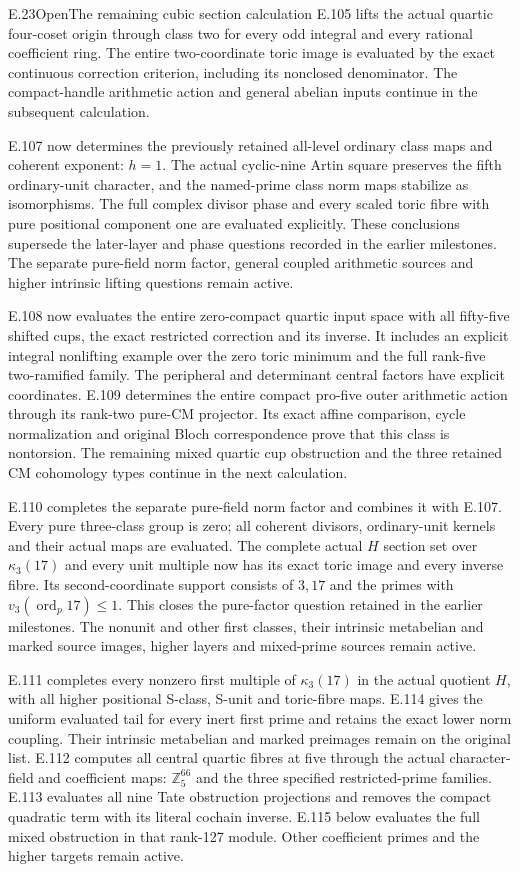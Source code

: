 \begin{statement}{E.23}{Open}{The remaining cubic section calculation}
E.105 lifts the actual quartic four-coset origin through class two
for every odd integral and every rational coefficient ring.
The entire two-coordinate toric image is evaluated by the exact
continuous correction criterion, including its nonclosed denominator.
The compact-handle arithmetic action and general abelian inputs
continue in the subsequent calculation.

E.107 now determines the previously retained all-level ordinary
class maps and coherent exponent: $h=1$.
The actual cyclic-nine Artin square preserves the fifth ordinary-unit
character, and the named-prime class norm maps stabilize as
isomorphisms. The full complex divisor phase and every scaled toric
fibre with pure positional component one are evaluated explicitly.
These conclusions supersede the later-layer and phase questions
recorded in the earlier milestones. The separate pure-field norm
factor, general coupled arithmetic sources and higher intrinsic
lifting questions remain active.


E.108 now evaluates the entire zero-compact quartic input space
with all fifty-five shifted cups, the exact restricted correction
and its inverse. It includes an explicit integral nonlifting example
over the zero toric minimum and the full rank-five two-ramified family.
The peripheral and determinant central factors have explicit coordinates.
E.109 determines the entire compact pro-five outer arithmetic action
through its rank-two pure-CM projector. Its exact affine comparison,
cycle normalization and original Bloch correspondence prove that this
class is nontorsion. The remaining mixed quartic cup obstruction and
the three retained CM cohomology types continue in the next calculation.

E.110 completes the separate pure-field norm factor and combines it
with E.107. Every pure three-class group is zero; all coherent divisors,
ordinary-unit kernels and their actual maps are evaluated.
The complete actual $H$ section set over $\kappa_3(17)$ and every
unit multiple now has its exact toric image and every inverse fibre.
Its second-coordinate support consists of $3,17$ and the primes
with $v_3(\operatorname{ord}_p17)\leq1$.
This closes the pure-factor question retained in the earlier milestones.
The nonunit and other first classes, their intrinsic metabelian and
marked source images, higher layers and mixed-prime sources remain active.

E.111 completes every nonzero first multiple of $\kappa_3(17)$
in the actual quotient $H$, with all higher positional S-class,
S-unit and toric-fibre maps. E.114 gives the uniform evaluated
tail for every inert first prime and retains the exact lower
norm coupling. Their intrinsic metabelian and marked preimages
remain on the original list.
E.112 computes all central quartic fibres at five through the
actual character-field and coefficient maps:
$\mathbb Z_5^{66}$ and the three specified restricted-prime
families. E.113 evaluates all nine Tate obstruction projections
and removes the compact quadratic term with its literal cochain
inverse. E.115 below evaluates the full mixed obstruction in that rank-127
module. Other coefficient primes and the higher targets remain active.


\end{statement}
